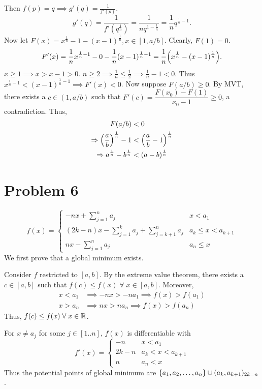 \documentclass[12pt]{article}
\begin{document}
Then $f(p) = q \implies g'(q) = \frac{1}{f'(p)}$. \[
    g'(q) = \frac{1}{f'(q^{\frac{1}{n}})} = \frac{1}{n q^{1 - \frac{1}{n}}} = \frac{1}{n} q^{\frac{1}{n} - 1}.
\] Now let $F(x) = x^{\frac{1}{n}} - 1 - (x - 1)^{\frac{1}{n}}, x \in [1, a/b]$.
Clearly, $F(1) = 0$. \[
    F'(x) = \frac{1}{n} x^{\frac{1}{n} - 1} - 0 - \frac{1}{n} (x - 1)^{\frac{1}{n} - 1} = \frac{1}{n} \paren{x^{\frac{1}{n}} - (x - 1)^{\frac{1}{n}}}.
\] $x \geq 1 \implies x > x - 1 > 0$.
$n \geq 2 \implies \frac{1}{n} \leq \frac{1}{2} \implies \frac{1}{n} - 1 < 0$.
Thus $x^{\frac{1}{n} - 1} < (x - 1)^{\frac{1}{n} - 1} \implies F'(x) < 0$.
Now suppose $F(a / b) \geq 0$.
By MVT, there exists a $c \in (1, a/b)$ such that $F'(c) = \dfrac{F(x_{0}) - F(1)}{x_{0} - 1} \geq 0$, a contradiction. Thus,
\begin{align*}
    F(a / b) &< 0 \\
    \implies \paren{\frac{a}{b}}^{\frac{1}{n}} - 1 &< \paren{\frac{a}{b} - 1}^{\frac{1}{n}} \\
    \implies a^{\frac{1}{n}} - b^{\frac{1}{n}} &< (a - b)^{\frac{1}{n}}
\end{align*}

\section*{Problem 6}
\[
    f(x) = 
    \begin{cases}
        - nx + \sum_{j = 1}^{n} a_{j} & x < a_{1} \\
        (2k - n) x - \sum_{j = 1}^{k} a_{j} + \sum_{j = k + 1}^{n} a_{j} & a_{k} \leq x < a_{k+1} \\
        nx - \sum_{j = 1}^{n} a_{j} & a_{n} \leq x
    \end{cases}
\]
We first prove that a global minimum exists.

Consider $f$ restricted to $[a, b]$.
By the extreme value theorem, there exists a $c \in [a, b]$ such that $f(c) \leq f(x) \;\forall\; x \in [a, b]$. Moreover, \begin{align*}
    x < a_{1} &\implies -nx > -n a_{1} \implies f(x) > f(a_{1}) \\
    x > a_{n} &\implies nx > na_{n} \implies f(x) > f(a_{n})
\end{align*}
Thus, $f(c) \leq f(x) \;\forall\; x \in \mathbb{R}$.

For $x \neq a_{j}$ for some $j \in [1 .. n]$, $f(x)$ is differentiable with \[
    f'(x) =
    \begin{cases}
        -n & x < a_{1} \\
        2k - n & a_{k} < x < a_{k+1} \\
        n & a_{n} < x
    \end{cases}
\] Thus the potential points of global minimum are $\set{a_{1}, a_{2}, \dots, a_{n}} \cup (a_{k}, a_{k+1})_{2k = n}$.
\end{document}
